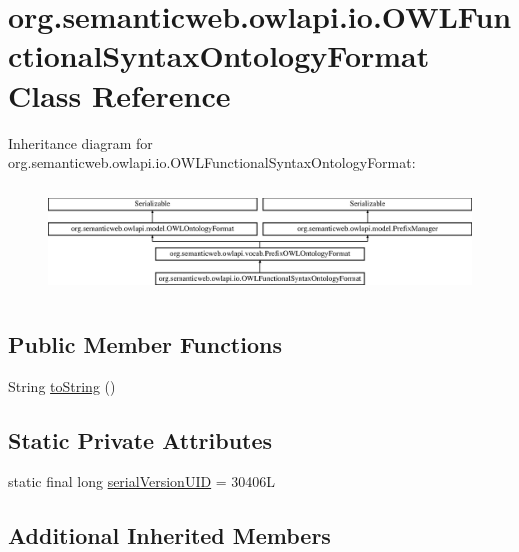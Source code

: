 \hypertarget{classorg_1_1semanticweb_1_1owlapi_1_1io_1_1_o_w_l_functional_syntax_ontology_format}{\section{org.\-semanticweb.\-owlapi.\-io.\-O\-W\-L\-Functional\-Syntax\-Ontology\-Format Class Reference}
\label{classorg_1_1semanticweb_1_1owlapi_1_1io_1_1_o_w_l_functional_syntax_ontology_format}
}
Inheritance diagram for org.\-semanticweb.\-owlapi.\-io.\-O\-W\-L\-Functional\-Syntax\-Ontology\-Format\-:\begin{figure}[H]
\begin{center}
\leavevmode
\includegraphics[height=2.886598cm]{classorg_1_1semanticweb_1_1owlapi_1_1io_1_1_o_w_l_functional_syntax_ontology_format}
\end{center}
\end{figure}
\subsection*{Public Member Functions}
\begin{DoxyCompactItemize}
\item 
String \hyperlink{classorg_1_1semanticweb_1_1owlapi_1_1io_1_1_o_w_l_functional_syntax_ontology_format_af3db35f192ac7cdd5c67c2807fc34bb6}{to\-String} ()
\end{DoxyCompactItemize}
\subsection*{Static Private Attributes}
\begin{DoxyCompactItemize}
\item 
static final long \hyperlink{classorg_1_1semanticweb_1_1owlapi_1_1io_1_1_o_w_l_functional_syntax_ontology_format_a105bde2fce468e741f65f6d22755ae82}{serial\-Version\-U\-I\-D} = 30406\-L
\end{DoxyCompactItemize}
\subsection*{Additional Inherited Members}


